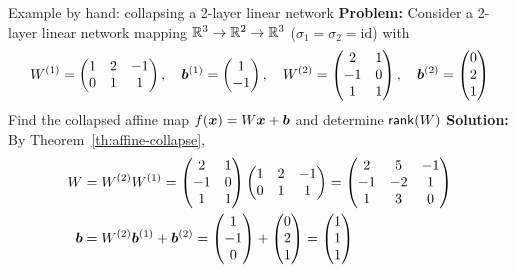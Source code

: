 \documentclass[aspectratio=169]{beamer}\usepackage[]{graphicx}\usepackage[]{xcolor}
\begin{document}
\begin{frame}{Example by hand: collapsing a 2-layer linear network}
\textbf{Problem:} Consider a 2-layer linear network mapping $\mathbb{R}^3 \to \mathbb{R}^2 \to \mathbb{R}^3$ ($\sigma_1 = \sigma_2 = \text{id}$) with
\[
W^{(1)} = \begin{pmatrix} 1 & 2 & -1 \\ 0 & 1 & 1 \end{pmatrix}, \quad
\bm{b}^{(1)} = \begin{pmatrix} 1 \\ -1 \end{pmatrix}, \quad
W^{(2)} = \begin{pmatrix} 2 & 1 \\ -1 & 0 \\ 1 & 1 \end{pmatrix}, \quad
\bm{b}^{(2)} = \begin{pmatrix} 0 \\ 2 \\ 1 \end{pmatrix}
\]
Find the collapsed affine map $f(\bm{x}) = W\bm{x} + \bm{b}$ and determine $\mathsf{rank}(W)$
\vfill
\textbf{Solution:} By Theorem~\ref{th:affine-collapse},
\begin{align*}
W &= W^{(2)} W^{(1)} =
\begin{pmatrix} 2 & 1 \\ -1 & 0 \\ 1 & 1 \end{pmatrix}
\begin{pmatrix} 1 & 2 & -1 \\ 0 & 1 & 1 \end{pmatrix}
=
\begin{pmatrix} 2 & 5 & -1 \\ -1 & -2 & 1 \\ 1 & 3 & 0 \end{pmatrix} \\
\bm{b} &= W^{(2)} \bm{b}^{(1)} + \bm{b}^{(2)} =
\begin{pmatrix} 1 \\ -1 \\ 0 \end{pmatrix}
+
\begin{pmatrix} 0 \\ 2 \\ 1 \end{pmatrix}
=
\begin{pmatrix} 1 \\ 1 \\ 1 \end{pmatrix}
\end{align*}
\end{frame}
\end{document}
